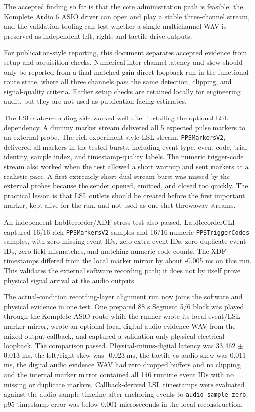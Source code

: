 \documentclass[11pt]{article}
\begin{document}
The accepted finding so far is that the core administration path is feasible:
the Komplete Audio 6 ASIO driver can open and play a stable three-channel
stream, and the validation tooling can test whether a single multichannel WAV
is preserved as independent left, right, and tactile-drive outputs.

For publication-style reporting, this document separates accepted evidence from
setup and acquisition checks. Numerical inter-channel latency and skew should
only be reported from a final matched-gain direct-loopback run in the functional
route state, where all three channels pass the same detection, clipping, and
signal-quality criteria. Earlier setup checks are retained locally for
engineering audit, but they are not used as publication-facing estimates.

The LSL data-recording side worked well after installing the optional LSL
dependency. A dummy marker stream delivered all 5 expected pulse markers to an
external probe. The rich experiment-style LSL stream,
\texttt{PPSMarkersV2}, delivered all markers in the tested bursts, including
event type, event code, trial identity, sample index, and timestamp-quality
labels. The numeric trigger-code stream also worked when the test allowed a
short warmup and sent markers at a realistic pace. A first extremely short
dual-stream burst was missed by the external probes because the sender opened,
emitted, and closed too quickly. The practical lesson is that LSL outlets
should be created before the first important marker, kept alive for the run,
and not used as one-shot throwaway streams.

An independent LabRecorder/XDF stress test also passed. LabRecorderCLI captured
16/16 rich \texttt{PPSMarkersV2} samples and 16/16 numeric
\texttt{PPSTriggerCodes} samples, with zero missing event IDs, zero extra event
IDs, zero duplicate event IDs, zero field mismatches, and matching numeric code
counts. The XDF timestamps differed from the local marker mirror by about
-0.005 ms on this run. This validates the external software recording path; it
does not by itself prove physical signal arrival at the audio outputs.

The actual-condition recording-layer alignment run now joins the software and
physical evidence in one test. One prepared 88 s Segment 5/6 block was played
through the Komplete ASIO route while the runner wrote its local event/LSL
marker mirror, wrote an optional local digital audio evidence WAV from the
mixed output callback, and captured a validation-only physical electrical
loopback. The comparison passed. Physical-minus-digital latency was
33.462 $\pm$ 0.013 ms, the left/right skew was -0.023 ms, the
tactile-vs-audio skew was 0.011 ms, the digital audio evidence WAV had zero
dropped buffers and no clipping, and the internal marker mirror contained all
146 runtime event IDs with no missing or duplicate markers. Callback-derived
LSL timestamps were evaluated against the audio-sample timeline after anchoring
events to \texttt{audio\_sample\_zero}; p95 timestamp error was below
0.001 microseconds in the local reconstruction.
\end{document}
